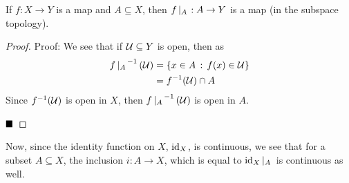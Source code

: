 \begin{lemma}
    If $f : X \to Y$ is a map and $A \subseteq X$, then $f \res{A} : A \to Y$ is a map (in the subspace topology). 
\end{lemma}
\begin{proof}{Proof:}
    We see that if $\cal{U} \subseteq Y$ is open, then as
    \begin{align*}
        f \res{A}^{-1}(\cal{U}) &= \{x \in A \col f(x) \in \cal{U}\}\\
        &= f^{-1}(\cal{U}) \cap A
    \end{align*}
    Since $f^{-1}(\cal{U})$ is open in $X$, then $f \res{A}^{-1}(\cal{U})$ is open in $A$. 

    $\qed$
\end{proof}

Now, since the identity function on $X$, $\id_{X}$, is continuous, we see that for a subset $A \subseteq X$, the inclusion $i : A \to X$, which is equal to $\id_{X} \res{A}$ is continuous as well.

